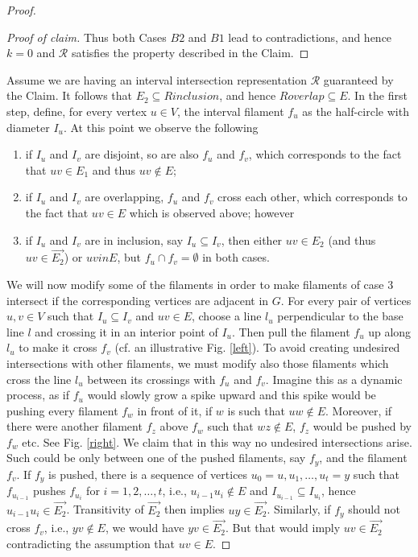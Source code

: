 \begin{proof}
\begin{proof}[Proof of claim]
		Thus both Cases $B2$ and $B1$ lead to contradictions, and hence $k = 0$ and $\mathcal{R}$ satisfies the property described in the Claim.
	\end{proof}
	
	Assume we are having an interval intersection representation $\mathcal{R}$ guaranteed by the Claim. It follows that $E_2 \subseteq Rinclusion$, and hence $Roverlap \subseteq E$. In the first step, define, for every vertex $u \in V$, the interval filament $f_u$ as the half-circle with diameter $I_u$. At this point we observe the following
	
	\begin{enumerate}
		\item if $I_u$ and $I_v$ are disjoint, so are also $f_u$ and $f_v$, which corresponds to the fact that $uv \in E_1$ and thus $uv \notin E$;
		\item if $I_u$ and $I_v$ are overlapping, $f_u$ and $f_v$ cross each other, which corresponds to the fact that $uv \in E$ which is observed above; however
		\item if $I_u$ and $I_v$ are in inclusion, say $I_u \subseteq I_v$, then either $uv \in E_2$ (and thus $uv \in \overrightarrow{E_2}$) or $uv in E$, but $f_u \cap f_v = \emptyset$ in both cases.
	\end{enumerate}
	
	We will now modify some of the filaments in order to make filaments of case 3 intersect if the corresponding vertices are adjacent in $G$. For every pair of vertices $u, v \in V$ such that $I_u \subseteq I_v$ and $uv \in E$, choose a line $l_u$ perpendicular to the base line $l$ and crossing it in an interior point of $I_u$. Then pull the filament $f_u$ up along $l_u$ to make it cross $f_v$ (cf. an illustrative Fig. \ref{left}). To avoid creating undesired intersections with other filaments, we must modify also those filaments which cross the line $l_u$ between its crossings with $f_u$ and $f_v$. Imagine this as a dynamic process, as if $f_u$ would slowly grow a spike upward and this spike would be pushing every filament $f_w$ in front of it, if $w$ is such that $uw \notin E$. Moreover, if there were another filament $f_z$ above $f_w$ such that $wz \notin E$, $f_z$ would be pushed by $f_w$ etc. See Fig. \ref{right}. We claim that in this way no undesired intersections arise. Such could be only between one of the pushed filaments, say $f_y$, and the filament $f_v$. If $f_y$ is pushed, there is a sequence of vertices $u_0 = u, u_1 , \dots , u_t = y$ such that $f_{u_{i-1}}$ pushes $f_{u_{i}}$ for $i = 1, 2, \dots , t$, i.e., $u_{i-1} u_i \notin E$	and $I_{u_{i-1}} \subseteq I_{u_{i}}$, hence $u_{i-1} u_i \in \overrightarrow{E_2}$. Transitivity of $\overrightarrow{E_2}$ then implies $uy \in \overrightarrow{E_2}$. Similarly, if $f_y$ should not cross $f_v$, i.e., $yv \notin E$, we would have $yv \in \overrightarrow{E_2}$. But that would imply $uv \in \overrightarrow{E_2}$ contradicting the assumption that $uv \in E$.
	

\end{proof}
